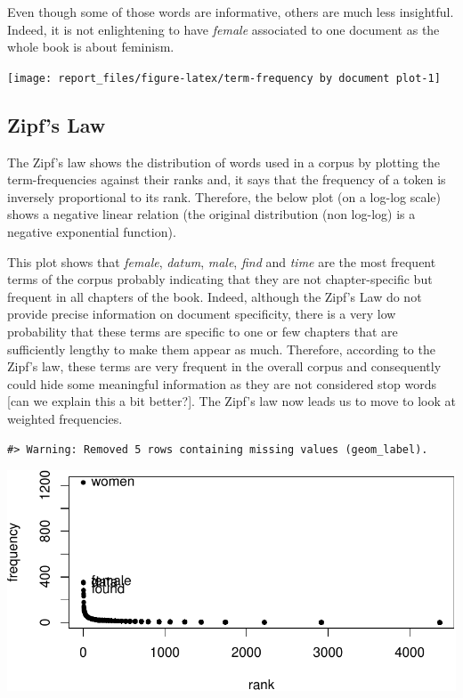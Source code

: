 \documentclass[
]{article}
\begin{document}
Even though some of those words are informative, others are much less
insightful. Indeed, it is not enlightening to have \emph{female}
associated to one document as the whole book is about feminism.

\begin{center}\texttt{[image: report\_files/figure-latex/term-frequency by document plot-1]} \end{center}

\hypertarget{zipfs-law}{%
\subsection{Zipf's Law}\label{zipfs-law}}

The Zipf's law shows the distribution of words used in a corpus by
plotting the term-frequencies against their ranks and, it says that the
frequency of a token is inversely proportional to its rank. Therefore,
the below plot (on a log-log scale) shows a negative linear relation
(the original distribution (non log-log) is a negative exponential
function).

This plot shows that \emph{female}, \emph{datum}, \emph{male},
\emph{find} and \emph{time} are the most frequent terms of the corpus
probably indicating that they are not chapter-specific but frequent in
all chapters of the book. Indeed, although the Zipf's Law do not provide
precise information on document specificity, there is a very low
probability that these terms are specific to one or few chapters that
are sufficiently lengthy to make them appear as much. Therefore,
according to the Zipf's law, these terms are very frequent in the
overall corpus and consequently could hide some meaningful information
as they are not considered stop words {[}can we explain this a bit
better?{]}. The Zipf's law now leads us to move to look at weighted
frequencies.

\begin{verbatim}
#> Warning: Removed 5 rows containing missing values (geom_label).
\end{verbatim}

\begin{center}\includegraphics[width=0.7\linewidth]{report_files/figure-latex/Zipf law plot-1} \end{center}
\end{document}
